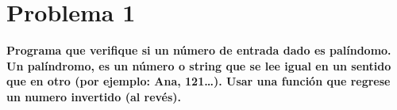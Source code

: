 \section*{Problema 1}
\textbf{Programa que verifique si un número de entrada dado es palíndomo. Un palíndromo, es un número o string que se lee igual en un sentido que en otro (por ejemplo: Ana, 121…). Usar una función que regrese un numero invertido (al revés).}